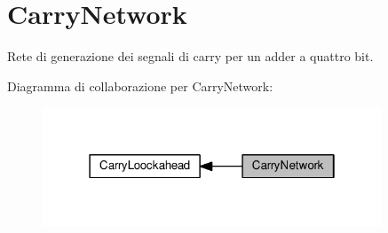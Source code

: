 \hypertarget{group___carry_network}{}\section{Carry\+Network}
\label{group___carry_network}


Rete di generazione dei segnali di carry per un adder a quattro bit.  


Diagramma di collaborazione per Carry\+Network\+:\nopagebreak
\begin{figure}[H]
\begin{center}
\leavevmode
\includegraphics[width=286pt]{group___carry_network}
\end{center}
\end{figure}
